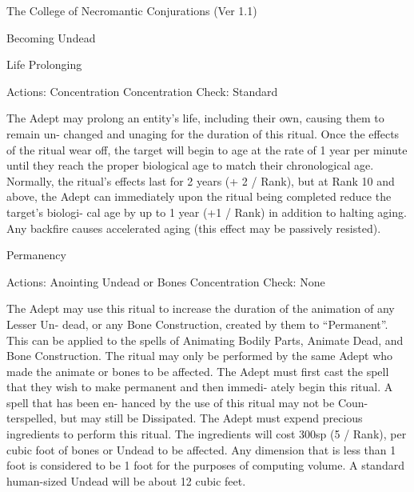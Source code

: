 \begin{Chapter}{The College of Necromantic Conjurations (Ver 1.1)}
\begin{ritual}[R-1]{Becoming Undead }
\begin{effects}
\end{effects}
\end{ritual}

\begin{ritual}[R-2]{Life Prolonging }

Actions: Concentration 
Concentration Check: Standard 
\begin{effects}
 The  Adept  may  prolong  an  entity’s  life, 
including  their  own,  causing  them  to  remain  un-
changed and unaging for the duration of this ritual. 
Once  the  effects  of  the  ritual  wear  off,  the  target 
will  begin  to  age  at  the  rate  of  1  year  per  minute 
until they reach the proper biological age to match 
their  chronological  age.  Normally,  the  ritual’s 
effects last for 2 years (+ 2 / Rank), but at Rank 10 
and  above,  the  Adept  can  immediately  upon  the 
ritual  being  completed  reduce  the  target’s  biologi-
cal  age  by  up  to  1  year  (+1  /  Rank)  in  addition to 
halting  aging.  Any  backfire  causes  accelerated 
aging (this effect may be passively resisted). 

\end{effects}
\end{ritual}

\begin{ritual}[R-3]{Permanency }


Actions: Anointing Undead or Bones 
Concentration Check: None 
\begin{effects}
 The  Adept  may  use  this  ritual  to  increase 
the  duration  of  the  animation  of  any  Lesser  Un-
dead, or any Bone Construction, created by them to 
“Permanent”.  This  can  be  applied  to  the  spells  of 
Animating  Bodily  Parts,  Animate  Dead,  and Bone 
Construction. The ritual may only be performed by 
the same Adept who made the animate or bones to 
be affected. The Adept must first cast the spell that 
they  wish  to  make  permanent  and  then  immedi-
ately  begin  this  ritual.  A  spell  that  has  been  en-
hanced by  the  use  of  this  ritual  may  not  be  Coun-
terspelled,  but  may  still  be  Dissipated.  The  Adept 
must  expend  precious  ingredients  to  perform  this 
ritual.  The  ingredients  will  cost  300sp  (5  /  Rank), 
per  cubic  foot  of  bones  or  Undead  to  be  affected. 
Any dimension that is less than 1 foot is considered 
to be 1 foot for the purposes of computing volume. 
A  standard  human-sized  Undead  will  be  about  12 
cubic feet. 


\end{effects}
\end{ritual}
\end{Chapter}
